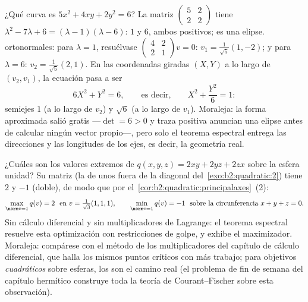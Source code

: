 \begin{example}\label{ex:b2:quadratic:ellipserun}
¿Qué curva es $5x^2 + 4xy + 2y^2 = 6$? La matriz $\begin{pmatrix} 5
& 2\\ 2 & 2\end{pmatrix}$ tiene  $\lambda^2
- 7\lambda + 6 = (\lambda - 1)(\lambda - 6)$:  $1$ y
$6$, ambos positivos; es una elipse.  ortonormales:
para $\lambda = 1$, resuélvase $\begin{pmatrix} 4 & 2\\ 2 &
1\end{pmatrix}v = 0$: $v_1 = \frac{1}{\sqrt5}(1, -2)$; y para
$\lambda = 6$: $v_2 = \frac{1}{\sqrt5}(2, 1)$. En las coordenadas
giradas $(X, Y)$ a lo largo de $(v_2, v_1)$, la ecuación pasa a ser
\[
6X^2 + Y^2 = 6,
\qquad\text{es decir,}\qquad
X^2 + \frac{Y^2}{6} = 1 :
\]
semiejes $1$ (a lo largo de $v_2$) y $\sqrt6$ (a lo largo de
$v_1$). Moraleja: la forma aproximada salió gratis ---$\det = 6 > 0$
y traza positiva anuncian una elipse antes de calcular ningún
vector propio---, pero solo el teorema espectral entrega las
direcciones y las longitudes de los ejes, es decir, la geometría
real.
\end{example}

\begin{example}\label{ex:b2:quadratic:sphereextremes}
¿Cuáles son los valores extremos de $q(x,y,z) = 2xy + 2yz + 2zx$
sobre la esfera unidad? Su matriz (la de unos fuera de la diagonal
del~\cref{exo:b2:quadratic:2}) tiene  $2$ y $-1$
(doble), de modo que por el~\cref{cor:b2:quadratic:principalaxes}~(2):
\[
\max_{\norm v = 1} q(v) = 2
\ \text{ en } v = \tfrac{1}{\sqrt3}(1,1,1),
\qquad
\min_{\norm v = 1} q(v) = -1
\ \text{ sobre la circunferencia } x + y + z = 0 .
\]
Sin cálculo diferencial y sin multiplicadores de Lagrange: el
teorema espectral resuelve esta optimización con restricciones de
golpe, y exhibe el maximizador. Moraleja: compárese con el método de
los multiplicadores del capítulo de cálculo diferencial, que halla
los mismos puntos críticos con más trabajo; para objetivos
\emph{cuadráticos} sobre esferas, los  son el camino real
(el problema de fin de semana del capítulo hermítico construye toda
la teoría de Courant--Fischer sobre esta observación).
\end{example}

